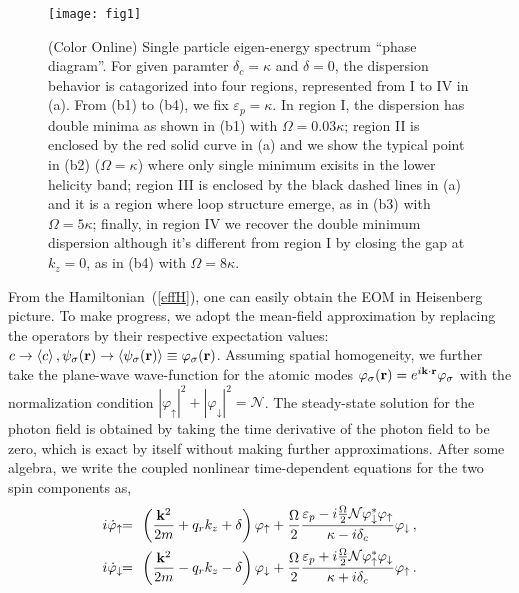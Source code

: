 \documentclass[atoms,article,submit,moreauthors,pdftex,12pt,a4paper]{mdpi}
\def\ba{\begin{eqnarray}}
\def\ea{\end{eqnarray}}
\begin{document}
\begin{figure}[htp]
\texttt{[image: fig1]}\caption{ (Color Online) Single particle eigen-energy spectrum ``phase diagram''. For given paramter $\delta_c=\kappa$ and $\delta=0$, the dispersion behavior is catagorized into four regions, represented from I to IV in (a). From (b1) to (b4), we fix $\varepsilon_p=\kappa$. In region I, the dispersion has double minima as shown in (b1) with $\Omega=0.03\kappa$; region II is enclosed by the red solid curve in (a) and we show the typical point in (b2) ($\Omega=\kappa$) where only single minimum exisits in the lower helicity band; region III is enclosed by the black dashed lines in (a) and it is a region where loop structure emerge, as in (b3) with $\Omega=5\kappa$; finally, in region IV we recover the double minimum dispersion although it's different from region I by closing the gap at $k_z=0$, as in (b4) with $\Omega=8\kappa$.}\label{fig1}
\end{figure}

From the Hamiltonian~(\ref{effH}), one can easily obtain the EOM in Heisenberg picture. To make progress, we adopt the mean-field approximation by replacing the operators by their respective expectation values: $c \rightarrow \langle c \rangle \,, \psi_\sigma ({\bf r}) \rightarrow \langle \psi_\sigma ({\bf r}) \rangle \equiv \varphi_\sigma ({\bf r})$. 
Assuming spatial homogeneity, we further take the plane-wave wave-function for the atomic modes $\varphi_\sigma({\bf r})=e^{i{\bf k}\cdot{\bf r}}\varphi_\sigma$ with the normalization condition $|\varphi_\uparrow|^2+|\varphi_\downarrow|^2=\mathcal{N}$. The steady-state solution for the photon field is obtained by taking the time derivative of the photon field to be zero, which is exact by itself without making further approximations. After some algebra, we write the coupled nonlinear time-dependent equations for the two spin components as, 
\ba
i\dot{\varphi}_{\uparrow}&\!\! =\!\! & \left(\frac{{\bf k}^{2}}{2m}+q_{r}k_{z}+\delta\right) \varphi_{\uparrow}+\frac{\Omega}{2}\frac{\varepsilon_{p}-i\frac{\Omega}{2} \mathcal{N}\varphi_\downarrow^\ast\varphi_\uparrow}{\kappa-i\delta_{c}}\varphi_{\downarrow} \,,\label{EOMphi1}\\
i\dot{\varphi}_{\downarrow} & \!\!= \!\!& \left(\frac{{\bf k}^{2}}{2m}-q_{r}k_{z}-\delta\right)\varphi_{\downarrow}+\frac{\Omega}{2}\frac{\varepsilon_{p}+i\frac{\Omega}{2} \mathcal{N}\varphi_\uparrow^\ast\varphi_\downarrow}{\kappa+i\delta_{c}}\varphi_{\uparrow}\,.\label{EOMphi2}
\ea
\end{document}

